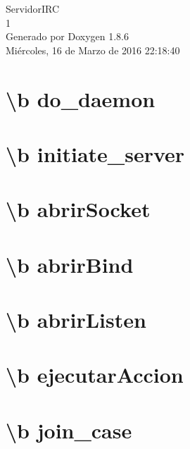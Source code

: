 \documentclass[twoside]{book}
\newcommand{\clearemptydoublepage}{%
  \newpage{\pagestyle{empty}\cleardoublepage}%
}
\begin{document}
\hypersetup{pageanchor=false}
\begin{titlepage}
\vspace*{7cm}
\begin{center}%
{\Large Servidor\-I\-R\-C \\[1ex]\large 1 }\\
\vspace*{1cm}
{\large Generado por Doxygen 1.8.6}\\
\vspace*{0.5cm}
{\small Miércoles, 16 de Marzo de 2016 22:18:40}\\
\end{center}
\end{titlepage}
\clearemptydoublepage
\tableofcontents
\clearemptydoublepage
{}
\hypersetup{pageanchor=true}

\chapter{\textbackslash{}b do\-\_\-daemon}
\label{do_daemon}
\hypertarget{do_daemon}{}

\chapter{\textbackslash{}b initiate\-\_\-server}
\label{initiate_server}
\hypertarget{initiate_server}{}

\chapter{\textbackslash{}b abrir\-Socket}
\label{abrirSocket}
\hypertarget{abrirSocket}{}

\chapter{\textbackslash{}b abrir\-Bind}
\label{abrirBind}
\hypertarget{abrirBind}{}

\chapter{\textbackslash{}b abrir\-Listen}
\label{abrirListen}
\hypertarget{abrirListen}{}

\chapter{\textbackslash{}b ejecutar\-Accion}
\label{ejecutarAccion}
\hypertarget{ejecutarAccion}{}

\chapter{\textbackslash{}b join\-\_\-case}
\label{join_case}
\hypertarget{join_case}{}

\end{document}
